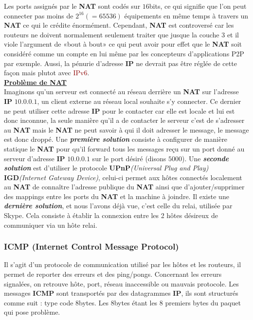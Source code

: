 \documentclass{article}
\newcommand{\red}[1]{\textcolor{darkred}{#1}}
\begin{document}
Les ports assignés par le \textbf{NAT} sont codés sur $16$bits, ce qui signifie que l'on peut connecter pas moins
de $2^{16} (= 65536)$ équipements en même temps à travers un \textbf{NAT} ce qui le crédite énormément. 
Cependant, \textbf{NAT} est controversé car les routeurs ne doivent normalement seulement traiter que jusque la 
couche 3 et il viole l'argument de «bout à bout» ce qui peut avoir pour effet que le \textbf{NAT} soit considéré 
comme un compte en lui même par les concepteurs d'applications P2P par exemple. Aussi, la pénurie d'adresse 
\textbf{IP} ne devrait pas être réglée de cette façon mais plutot avec \red{IPv6}. \\

\textbf{\underline{Problème de \textbf{NAT}}} \\

Imaginons qu'un serveur est connecté au réseau derrière un \textbf{NAT} sur l'adresse \textbf{IP} $10.0.0.1$, un 
client externe au réseau local souhaite s'y connecter. Ce dernier ne peut utiliser cette adresse \textbf{IP} pour
le contacter car elle est locale et lui est donc inconnue, la seule manière qu'il a de contacter le serveur c'est
de s'adresser au \textbf{NAT} mais le \textbf{NAT} ne peut savoir à qui il doit adresser le message, le message
est donc droppé. Une \textit{\textbf{première solution}} consiste à configurer de manière statique le 
\textbf{NAT} pour qu'il forward tous les messages reçu sur un port donné au serveur d'adresse \textbf{IP} 
$10.0.0.1$ sur le port désiré (disons $5000$). Une \textit{\textbf{seconde solution}} est d'utiliser le protocole
\textbf{UPnP}\textit{(Universal Plug and Play)} \textbf{IGD}\textit{(Internet Gateway Device)}, celui-ci permet 
aux hôtes connectés localement au \textbf{NAT} de connaître l'adresse publique du \textbf{NAT} ainsi que 
d'ajouter/supprimer des mappings entre les ports du \textbf{NAT} et la machine à joindre. Il existe une 
\textbf{\textit{dernière solution}}, et nous l'avons déjà vue, c'est celle du relai, utilisée par Skype. Cela 
consiste à établir la connexion entre les 2 hôtes désireux de communiquer via un hôte relai.

\subsubsection{ICMP (Internet Control Message Protocol)}

Il s'agit d'un protocole de communication utilisé par les hôtes et les routeurs, il permet de reporter des 
erreurs et des ping/pongs. Concernant les erreurs signalées, on retrouve hôte, port, réseau inaccessible ou 
mauvais protocole. Les messages \textbf{ICMP} sont transportés par des datagrammes \textbf{IP}, ils sont 
structurés comme suit : type code 8bytes. Les 8bytes étant les 8 premiers bytes du paquet qui pose problème.
\end{document}
